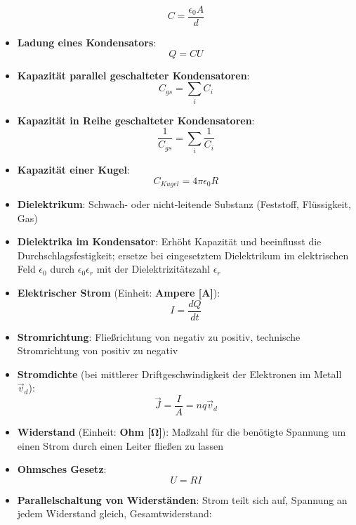\begin{itemize}
\begin{equation}
		C = \frac{\epsilon_0 A}{d}
	\end{equation}
	\item \textbf{Ladung eines Kondensators}:
	\begin{equation}
		Q = CU
	\end{equation}
	\item \textbf{Kapazität parallel geschalteter Kondensatoren}:
	\begin{equation}
		C_{gs} = \sum_i C_i
	\end{equation}
	\item \textbf{Kapazität in Reihe geschalteter Kondensatoren}:
	\begin{equation}
		\frac{1}{C_{gs}} = \sum_i \frac{1}{C_{i}}
	\end{equation}
	\item \textbf{Kapazität einer Kugel}:
	\begin{equation}
		C_{Kugel} = 4\pi\epsilon_0R
	\end{equation}
	\item \textbf{Dielektrikum}: Schwach- oder nicht-leitende Substanz (Feststoff, Flüssigkeit, Gas)
	\item \textbf{Dielektrika im Kondensator}: Erhöht Kapazität und beeinflusst die Durchschlagsfestigkeit; ersetze bei eingesetztem Dielektrikum im elektrischen Feld $\epsilon_0$ durch $\epsilon_0\epsilon_r$ mit der Dielektrizitätszahl $\epsilon_r$
	\item \textbf{Elektrischer Strom} (Einheit: \textbf{Ampere [A]}): 
	\begin{equation}
		I = \frac{dQ}{dt}
	\end{equation}
	\item \textbf{Stromrichtung}: Fließrichtung von negativ zu positiv, technische Stromrichtung von positiv zu negativ
	\item \textbf{Stromdichte} (bei mittlerer Driftgeschwindigkeit der Elektronen im Metall $\vec{v}_d$):
	\begin{equation}
		\vec{J} = \frac{I}{A} = nq\vec{v}_d
	\end{equation}
	\item \textbf{Widerstand} (Einheit: \textbf{Ohm [$\mathbf{\Omega}$]}): Maßzahl für die benötigte Spannung um einen Strom durch einen Leiter fließen zu lassen
	\item \textbf{Ohmsches Gesetz}:
	\begin{equation}
		U = R I
	\end{equation}
	\item \textbf{Parallelschaltung von Widerständen}: Strom teilt sich auf, Spannung an jedem Widerstand gleich, Gesamtwiderstand:

\end{itemize}
